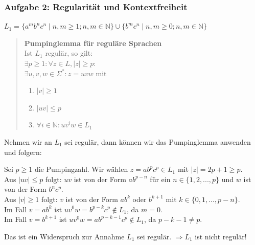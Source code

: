 \newpage
\subsubsection{Aufgabe 2: Regularität und Kontextfreiheit}

\begin{teile}
	\item
	$L_1 = \{a^mb^nc^n \mid n,m \geq 1; n,m \in \mathbb{N} \} \cup \{ b^m c^n \mid n,m \geq 0; n,m \in \mathbb{N}\}$	
	
	\begin{quote}
	\textbf{Pumpinglemma für reguläre Sprachen} \\
    Ist $L_1$ regulär, so gilt: \\
    $\exists p \geq 1: \forall z \in L, |z| \geq p:$ \\
    $\exists u,v,w \in \Sigma^*: z = uvw$ mit
    \begin{enumerate}
    	\item $|v|  \geq 1$
    	\item $|uv| \leq p$
    	\item $\forall i \in \mathbb{N} : uv^{i}w \in L_1$
    \end{enumerate}
	\end{quote}
	
	Nehmen wir an $L_1$ sei regulär, dann können wir das Pumpinglemma anwenden und folgern:
	
	Sei $p \geq 1$ die Pumpingzahl. Wir wählen $z = ab^pc^p \in L_1$ mit $|z| = 2p+1 \geq p$.\\
	Aus $|uv| \leq p$ folgt: $uv$ ist von der Form $ab^{p-n}$ für ein $n \in \{1,2,...,p\}$ und $w$ ist von der Form $b^nc^p$.\\
	Aus $|v|  \geq 1$ folgt: $v$ ist von der Form $ab^k$ oder $b^{k+1}$ mit $k \in \{0,1,...,p-n\}$.\\
	Im Fall $v=ab^k$ ist $uv^0w=b^{p-k}c^p \notin L_1$, da $m=0$.\\
	Im Fall $v=b^{k+1}$ ist $uv^0w=ab^{p-k-1}c^p \notin L_1$, da $p-k-1\neq p$.
	
	Das ist ein Widerspruch zur Annahme $L_1$ sei regulär. $\Rightarrow L_1$ ist nicht regulär!
    
    \vspace{0.3cm}
	

\end{teile}
